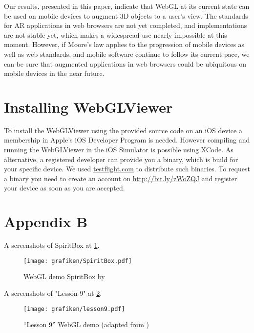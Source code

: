 \documentclass[12pt,journal,compsoc]{IEEEtran}
\begin{document}
Our results, presented in this paper, indicate that WebGL at its current state can be used on mobile devices to augment 3D objects to a user’s view. The standards for AR applications in web browsers are not yet completed, and implementations are not stable yet,  which makes a widespread use nearly impossible at this moment. However, if Moore’s law \cite{Schaller1997} applies to the progression of mobile devices as well as web standards, and mobile software continue to follow its current pace, we can be sure that augmented applications in web browsers could be ubiquitous on mobile devices in the near future.





\appendices
\section*{Installing WebGLViewer}
To install the WebGLViewer using the provided source code on an iOS device a membership in Apple's iOS Developer Program is needed. However compiling and running the WebGLViewer in the iOS Simulator is possible using XCode. As alternative, a registered developer can provide you a binary, which is build for your specific device. We used \url{testflight.com} to distribute such binaries. To request a binary you need to create an account on \url{http://bit.ly/zWoZQJ} and register your device as soon as you are accepted.

\section*{Appendix B}
A screenshots of SpiritBox at \ref{fig:spiritbox}.
\begin{figure}
	\centerline{\texttt{[image: grafiken/SpiritBox.pdf]}}
	\caption{WebGL demo SpiritBox by \cite{SpiritBox}}
	\label{fig:spiritbox}
\end{figure}

A screenshots of "Lesson 9" at \ref{fig:lesson9}.

\begin{figure}
	\centerline{\texttt{[image: grafiken/lesson9.pdf]}}
	\caption{“Lesson 9” WebGL demo (adapted from \cite{lesson9})}
	\label{fig:lesson9}
\end{figure}

\ifCLASSOPTIONcaptionsoff
  \newpage
\fi





\end{document}
